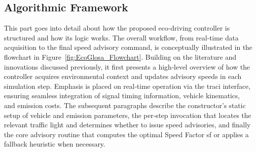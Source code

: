 \subsection{Algorithmic Framework}
\label{sec:EcoGlosa_Framework}

This part goes into detail about how the proposed eco-driving controller is structured and how its logic works. The overall workflow, from real-time data acquisition to the final speed advisory command, is conceptually illustrated in the flowchart in Figure~\vref{fig:EcoGlosa_Flowchart}. Building on the literature and innovations discussed previously, it first presents a high‐level overview of how the controller acquires environmental context and updates advisory speeds in each simulation step. Emphasis is placed on real‐time operation via the \ac{traci} interface, ensuring seamless integration of signal timing information, vehicle kinematics, and emission costs. The subsequent paragraphs describe the constructor’s static setup of vehicle and emission parameters, the per‐step invocation that locates the relevant traffic light and determines whether to issue speed advisories, and finally the core advisory routine that computes the optimal Speed Factor \gls{sf} or applies a fallback heuristic when necessary.

